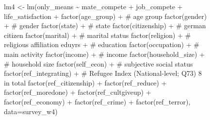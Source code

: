 \documentclass[
]{article}
\newenvironment{Shaded}{\begin{snugshade}}{\end{snugshade}}
\newcommand{\AttributeTok}[1]{\textcolor[rgb]{0.40,0.45,0.13}{#1}}
\newcommand{\CommentTok}[1]{\textcolor[rgb]{0.37,0.37,0.37}{#1}}
\newcommand{\FunctionTok}[1]{\textcolor[rgb]{0.28,0.35,0.67}{#1}}
\newcommand{\NormalTok}[1]{\textcolor[rgb]{0.00,0.23,0.31}{#1}}
\newcommand{\OtherTok}[1]{\textcolor[rgb]{0.00,0.23,0.31}{#1}}
\newcommand{\SpecialCharTok}[1]{\textcolor[rgb]{0.37,0.37,0.37}{#1}}
\begin{document}
\begin{figure}
\begin{table}
\begin{minipage}[t]{\linewidth}
{\begin{Shaded}
\begin{Highlighting}[]
\NormalTok{lm4 }\OtherTok{\textless{}{-}} \FunctionTok{lm}\NormalTok{(only\_means }\SpecialCharTok{\textasciitilde{}}\NormalTok{ mate\_compete }\SpecialCharTok{+}\NormalTok{ job\_compete }\SpecialCharTok{+}\NormalTok{ life\_satisfaction }\SpecialCharTok{+} 
            \FunctionTok{factor}\NormalTok{(age\_group) }\SpecialCharTok{+}   \CommentTok{\# age group}
            \FunctionTok{factor}\NormalTok{(gender) }\SpecialCharTok{+}   \CommentTok{\# gender }
            \FunctionTok{factor}\NormalTok{(state) }\SpecialCharTok{+}   \CommentTok{\# state  }
            \FunctionTok{factor}\NormalTok{(citizenship) }\SpecialCharTok{+}  \CommentTok{\# german citizen}
            \FunctionTok{factor}\NormalTok{(marital) }\SpecialCharTok{+}  \CommentTok{\# marital status}
            \FunctionTok{factor}\NormalTok{(religion) }\SpecialCharTok{+}  \CommentTok{\# religious affiliation}
\NormalTok{            eduyrs }\SpecialCharTok{+}  \CommentTok{\# education}
            \FunctionTok{factor}\NormalTok{(occupation) }\SpecialCharTok{+}  \CommentTok{\# main activity}
            \FunctionTok{factor}\NormalTok{(income) }\SpecialCharTok{+} \CommentTok{\# income}
            \FunctionTok{factor}\NormalTok{(household\_size) }\SpecialCharTok{+} \CommentTok{\# household size}
            \FunctionTok{factor}\NormalTok{(self\_econ) }\SpecialCharTok{+} \CommentTok{\# subjective social status}
            \FunctionTok{factor}\NormalTok{(ref\_integrating) }\SpecialCharTok{+} \CommentTok{\# Refugee Index (National{-}level; Q73) 8 in total}
            \FunctionTok{factor}\NormalTok{(ref\_citizenship) }\SpecialCharTok{+} \FunctionTok{factor}\NormalTok{(ref\_reduce) }\SpecialCharTok{+} \FunctionTok{factor}\NormalTok{(ref\_moredone) }\SpecialCharTok{+} \FunctionTok{factor}\NormalTok{(ref\_cultgiveup) }\SpecialCharTok{+} 
            \FunctionTok{factor}\NormalTok{(ref\_economy) }\SpecialCharTok{+} \FunctionTok{factor}\NormalTok{(ref\_crime) }\SpecialCharTok{+} \FunctionTok{factor}\NormalTok{(ref\_terror),}
          \AttributeTok{data=}\NormalTok{survey\_w4)}


\end{Highlighting}
\end{Shaded}}
\end{minipage}
\end{table}
\end{figure}
\end{document}
